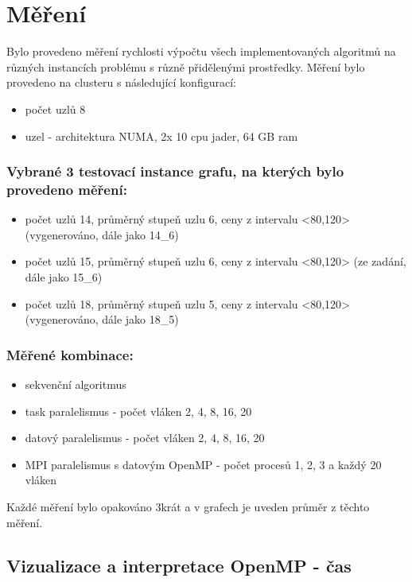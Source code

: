 \documentclass{article}%
\begin{document}
\section{Měření}%
Bylo provedeno měření rychlosti výpočtu všech implementovaných algoritmů na různých instancích problému s různě přidělenými prostředky. Měření bylo provedeno na clusteru s následující konfigurací:
\begin{itemize}
    \item počet uzlů 8
    \item uzel - architektura NUMA, 2x 10 cpu jader, 64 GB ram
\end{itemize}

\subsubsection*{Vybrané 3 testovací instance grafu, na kterých bylo provedeno měření:}
\begin{itemize}
    \item počet uzlů 14, průměrný stupeň uzlu 6, ceny z intervalu <80,120> (vygenerováno, dále jako 14\_6)
    \item počet uzlů 15, průměrný stupeň uzlu 6, ceny z intervalu <80,120> (ze zadání, dále jako 15\_6)
    \item počet uzlů 18, průměrný stupeň uzlu 5, ceny z intervalu <80,120> (vygenerováno, dále jako 18\_5)
\end{itemize}


\subsubsection*{Měřené kombinace:}
\begin{itemize}
    \item sekvenční algoritmus
    \item task paralelismus - počet vláken 2, 4, 8, 16, 20
    \item datový paralelismus - počet vláken 2, 4, 8, 16, 20
    \item MPI paralelismus s datovým OpenMP - počet procesů 1, 2, 3 a každý 20 vláken
\end{itemize}
Každé měření bylo opakováno 3krát a v grafech je uveden průměr z těchto měření.

\subsection{Vizualizace a interpretace OpenMP - čas}
\end{document}
